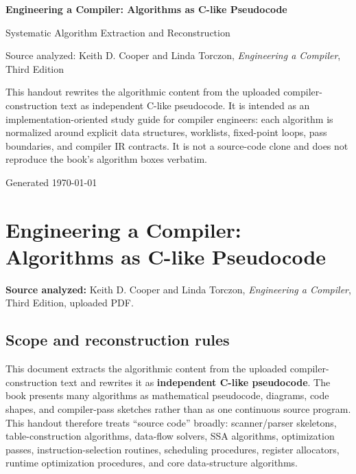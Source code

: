 \documentclass[10pt,letterpaper]{article}
\newcommand{\handouttitle}{Engineering a Compiler: Algorithms as C-like Pseudocode}
\begin{document}
\begin{titlepage}
\centering
\vspace*{1.0in}
{\Huge\bfseries\color{HouseBlue}\handouttitle\par}
\vspace{0.25in}
{\Large Systematic Algorithm Extraction and Reconstruction\par}
\vspace{0.35in}
{\large Source analyzed: Keith D. Cooper and Linda Torczon, \emph{Engineering a Compiler}, Third Edition\par}
\vfill
\begin{minipage}{0.86\textwidth}
\small
This handout rewrites the algorithmic content from the uploaded compiler-construction text as independent C-like pseudocode. It is intended as an implementation-oriented study guide for compiler engineers: each algorithm is normalized around explicit data structures, worklists, fixed-point loops, pass boundaries, and compiler IR contracts. It is not a source-code clone and does not reproduce the book's algorithm boxes verbatim.
\end{minipage}
\vfill
{\large Generated \today\par}
\end{titlepage}
\clearpage
{}
\tableofcontents
\clearpage
{}

\clearpage
\section*{Engineering a Compiler: Algorithms as C-like Pseudocode}

\textbf{Source analyzed:} Keith D. Cooper and Linda Torczon, \emph{Engineering a Compiler}, Third Edition, uploaded PDF.

\subsection*{Scope and reconstruction rules}
{}

This document extracts the algorithmic content from the uploaded compiler-construction text and rewrites it as \textbf{independent C-like pseudocode}. The book presents many algorithms as mathematical pseudocode, diagrams, code shapes, and compiler-pass sketches rather than as one continuous source program. This handout therefore treats ``source code'' broadly: scanner/parser skeletons, table-construction algorithms, data-flow solvers, SSA algorithms, optimization passes, instruction-selection routines, scheduling procedures, register allocators, runtime optimization procedures, and core data-structure algorithms.
\end{document}
